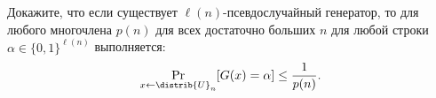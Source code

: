 Докажите, что если существует $\ell(n)$-псевдослучайный генератор, то для любого многочлена $p(n)$ для
всех достаточно больших $n$ для любой строки $\alpha \in \{0, 1\}^{\ell(n)}$ выполняется:
$$
    \Pr\limits_{x \gets \distrib{U}_n}[G(x) = \alpha] \le \frac{1}{p(n)}.
$$